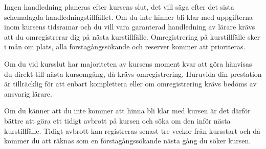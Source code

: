 \documentclass[a4paper,logo]{miunart}
\begin{document}
Ingen handledning planeras efter kursens slut, det vill säga efter det sista 
schemalagda handledningstillfället.
Om du inte hinner bli klar med uppgifterna inom kursens tidsramar och du vill 
vara garanterad handledning av lärare krävs att du omregistrerar dig på nästa 
kurstillfälle.
Omregistrering på kurstillfälle sker i mån om plats, alla förstagångssökande 
och reserver kommer att prioriteras.

Om du vid kursslut har majoriteten av kursens moment kvar att göra hänvisas du 
direkt till nästa kursomgång, då krävs omregistrering.
Huruvida din prestation är tillräcklig för att enbart komplettera eller om 
omregistrering krävs bedöms av ansvarig lärare.

Om du känner att du inte kommer att hinna bli klar med kursen är det därför 
bättre att göra ett tidigt avbrott på kursen och söka om den inför nästa 
kurstillfälle.
Tidigt avbrott kan registreras senast tre veckor från kursstart och då kommer 
du att räknas som en förstagångssökande nästa gång du söker kursen.


\printbibliography
\end{document}
